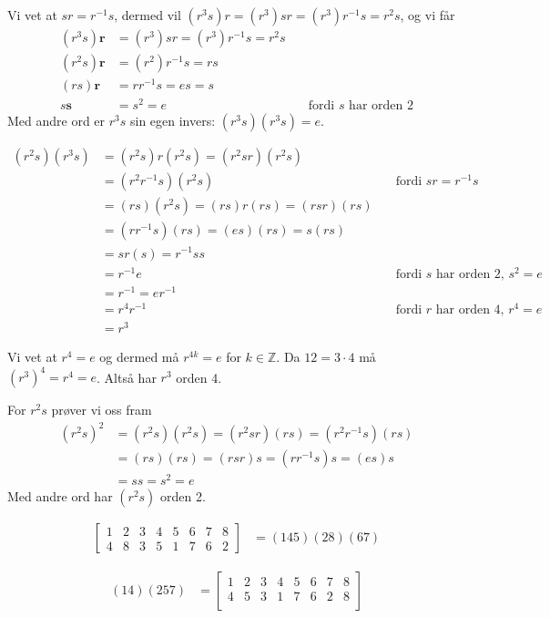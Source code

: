 \documentclass[a4paper,norsk,12pt]{article}
\begin{document}
Vi vet at $sr=r^{-1}s$, dermed vil $(r^3s)r = (r^3)sr = (r^3)r^{-1}s = r^2s$,
og vi får
\begin{align*}
  (r^3s)\mathbf{r} &= (r^3)sr = (r^3)r^{-1}s = r^2s \\
  (r^2s)\mathbf{r} &= (r^2)r^{-1}s = rs \\
  (rs)\mathbf{r} &= rr^{-1}s = es = s \\
  s\mathbf{s} &= s^2 = e & \quad\text{fordi $s$ har orden 2}
\end{align*}
Med andre ord er $r^3s$ sin egen invers: $(r^3s)(r^3s) = e$.

\begin{align*}
  (r^2s)(r^3s) &= (r^2s)r(r^2s) = (r^2sr)(r^2s) \\
               &= (r^2r^{-1}s)(r^2s)  & \quad\text{fordi } sr=r^{-1}s \\
               &= (rs)(r^2s) = (rs)r(rs) = (rsr)(rs) \\
               &= (rr^{-1}s)(rs) = (es)(rs) = s(rs) \\
               &= sr(s) = r^{-1}ss \\
               &= r^{-1}e & \quad\text{fordi $s$ har orden 2, } s^2=e \\
               &= r^{-1} = er^{-1} \\
               &= r^4r^{-1} & \quad\text{fordi $r$ har orden 4, } r^4=e \\
               &= r^3
\end{align*}

Vi vet at $r^4=e$ og dermed må $r^{4k}=e$ for $k\in\mathbb{Z}$. Da $12 = 3\cdot4$ må
$(r^3)^4=r^4=e$. Altså har $r^3$ orden 4.

For $r^2s$ prøver vi oss fram
\begin{align*}
  (r^2s)^2 &= (r^2s)(r^2s) = (r^2sr)(rs) = (r^2r^{-1}s)(rs) \\
           &= (rs)(rs) = (rsr)s = (rr^{-1}s)s = (es)s \\
           &= ss = s^2 = e
\end{align*}
Med andre ord har $(r^2s)$ orden 2.

\begin{align*}
  \left[\begin{matrix}
      1 & 2 & 3 & 4 & 5 & 6 & 7 & 8 \\
      4 & 8 & 3 & 5 & 1 & 7 & 6 & 2
  \end{matrix}\right] &=
  (145)(28)(67)
\end{align*}


\begin{align*}
  (14)(257) &=
  \left[\begin{matrix}
      1 & 2 & 3 & 4 & 5 & 6 & 7 & 8 \\
      4 & 5 & 3 & 1 & 7 & 6 & 2 & 8 \\
  \end{matrix}\right]
\end{align*}

\end{document}
